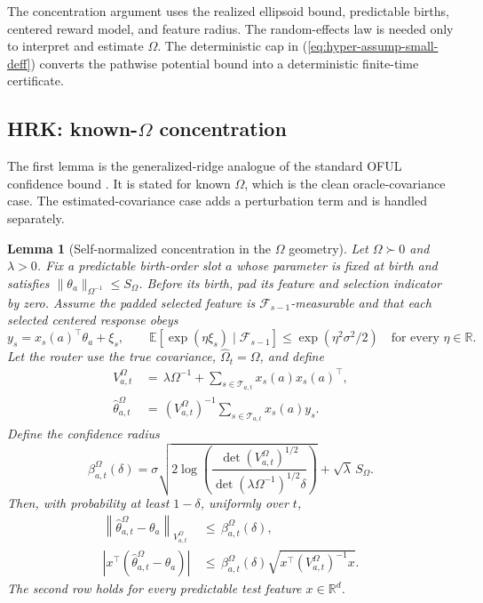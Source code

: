 \documentclass{article} %
\newtheorem{lemma}[theorem]{Lemma}
\renewcommand{\eqref}[1]{\textup{(\ref{#1})}}
\begin{document}
The concentration argument uses the realized ellipsoid bound, predictable
births, centered reward model, and feature radius. The random-effects law is
needed only to interpret and estimate $\Omega$. The deterministic cap in
\eqref{eq:hyper-assump-small-deff} converts the pathwise potential bound into
a deterministic finite-time certificate.

\subsection{\texorpdfstring{HRK: known-\(\Omega\) concentration}{HRK: known-Omega concentration}}

The first lemma is the generalized-ridge analogue of the standard OFUL confidence bound \citep{abbasi2011oful,chu2011linucb}.  It is stated for known \(\Omega\), which is the clean oracle-covariance case.  The estimated-covariance case adds a perturbation term and is handled separately.

\begin{lemma}[Self-normalized concentration in the \(\Omega\) geometry]
\label{lem:hyper-sn}
Let \(\Omega\succ0\) and \(\lambda>0\). Fix a predictable birth-order slot
\(a\) whose parameter is fixed at birth and satisfies
\(\|\theta_a\|_{\Omega^{-1}}\le S_\Omega\). Before its birth, pad its feature
and selection indicator by zero. Assume the padded selected feature is
\(\mathcal F_{s-1}\)-measurable and that each selected centered response obeys
\begin{equation}
y_s=x_s(a)^\top\theta_a+\xi_s,
\qquad
\mathbb E[\exp(\eta\xi_s)\mid\mathcal F_{s-1}]
\le \exp(\eta^2\sigma^2/2)
\quad\text{for every }\eta\in\mathbb R.
\end{equation}
Let the router use the true covariance, \(\widehat\Omega_t=\Omega\), and define
\begin{align}
V_{a,t}^{\Omega}
&\,=\,
\lambda\Omega^{-1}
+
\sum_{s\in\mathcal{T}_{a,t}}
x_s(a)x_s(a)^\top,
\label{eq:hyper-known-V}
\\
\widehat{\theta}_{a,t}^{\Omega}
&\,=\,
\left(V_{a,t}^{\Omega}\right)^{-1}
\sum_{s\in\mathcal{T}_{a,t}}
x_s(a)y_s.
\label{eq:hyper-known-est}
\end{align}
Define the confidence radius
\begin{equation}
\label{eq:hyper-beta}
\beta_{a,t}^{\Omega}(\delta)
=
\sigma
\sqrt{
2\log
\left(
\frac{
\det(V_{a,t}^{\Omega})^{1/2}
}{
\det(\lambda\Omega^{-1})^{1/2}\delta
}
\right)
}
+
\sqrt{\lambda}\,S_{\Omega}.
\end{equation}
Then, with probability at least \(1-\delta\), uniformly over \(t\),
\begin{align}
\left\|
\widehat{\theta}_{a,t}^{\Omega}-\theta_a
\right\|_{V_{a,t}^{\Omega}}
&\,\leq\,
\beta_{a,t}^{\Omega}(\delta),
\label{eq:hyper-sn-param}
\\
\left|
x^\top
\left(
\widehat{\theta}_{a,t}^{\Omega}-\theta_a
\right)
\right|
&\,\leq\,
\beta_{a,t}^{\Omega}(\delta)
\sqrt{x^\top\left(V_{a,t}^{\Omega}\right)^{-1}x}.
\label{eq:hyper-sn-prediction}
\end{align}
The second row holds for every predictable test feature \(x\in\mathbb R^d\).
\end{lemma}
\end{document}
